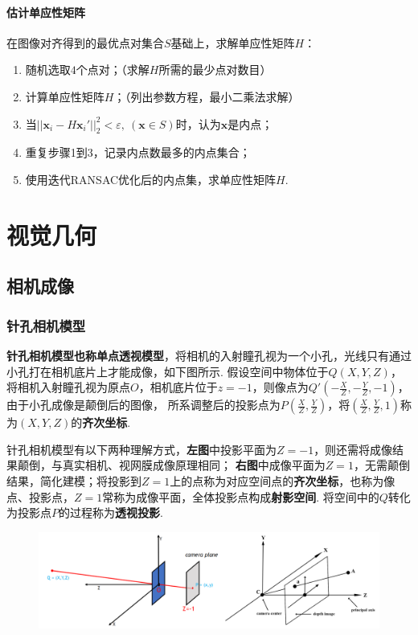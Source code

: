 \documentclass[12pt, a4paper, oneside]{ctexart}
\numberwithin{equation}{section}  %
\theoremstyle{definition}
\def\bd{\boldsymbol}        %
\def\tsty{\textstyle}       %
\begin{document}
\paragraph{估计单应性矩阵} 在图像对齐得到的最优点对集合$S$基础上，求解单应性矩阵$H$：
\begin{enumerate}
    \item 随机选取$4$个点对；（求解$H$所需的最少点对数目）
    \item 计算单应性矩阵$H$；（列出参数方程，最小二乘法求解）
    \item 当$||\bd{x}_i-H\bd{x}_i'||_2^2 < \varepsilon,\ (\bd{x}\in S)$时，认为$\bd{x}$是内点；
    \item 重复步骤1到3，记录内点数最多的内点集合；
    \item 使用迭代RANSAC优化后的内点集，求单应性矩阵$H$.
\end{enumerate}
\section{视觉几何}
\subsection{相机成像}
\subsubsection{针孔相机模型}
\textbf{针孔相机模型也称单点透视模型}，将相机的入射瞳孔视为一个小孔，光线只有通过小孔打在相机底片上才能成像，如下图所示. 假设空间中物体位于$Q(X,Y,Z)$，
将相机入射瞳孔视为原点$O$，相机底片位于$z=-1$，则像点为$\tsty Q'(-\frac{X}{Z},-\frac{Y}{Z},-1)$，由于小孔成像是颠倒后的图像，
所系调整后的投影点为$\tsty P(\frac{X}{Z},\frac{Y}{Z})$，将$\tsty (\frac{X}{Z},\frac{Y}{Z},1)$称为$(X,Y,Z)$的\textbf{齐次坐标}.

针孔相机模型有以下两种理解方式，\textbf{左图}中投影平面为$Z=-1$，则还需将成像结果颠倒，与真实相机、视网膜成像原理相同；
\textbf{右图}中成像平面为$Z=1$，无需颠倒结果，简化建模；将投影到$Z=1$上的点称为对应空间点的\textbf{齐次坐标}，也称为像点、投影点，$Z=1$常称为成像平面，全体投影点构成\textbf{射影空间}.
将空间中的$Q$转化为投影点$P$的过程称为\textbf{透视投影}.
\begin{figure}[htbp]
    \hspace{-1cm}
    \includegraphics[scale=0.6]{透视投影.png}
\end{figure}
\end{document}
